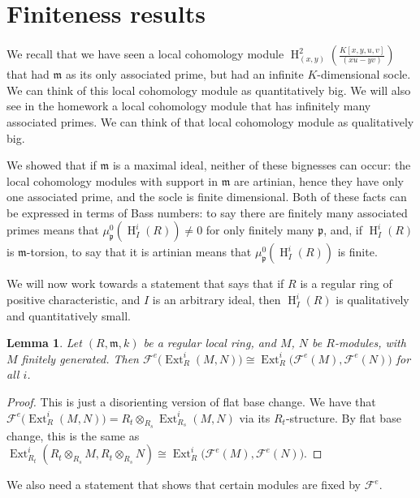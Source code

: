 \documentclass[11pt]{book}
\newtheorem{lemma}[theorem]{Lemma}
\numberwithin{equation}{section}
\numberwithin{theorem}{chapter}
\theoremstyle{definition}
\newtheorem*{basic properties}{Basic Properties}
\newtheorem*{Important Remark}{Important Remark}
\theoremstyle{remark}
\newcommand{\m}{\mathfrak{m}}
\newcommand{\p}{\mathfrak{p}}
\newcommand{\cF}{\mathcal{F}}
\newcommand{\Ext}{\operatorname{Ext}}
\renewcommand{\H}{\operatorname{H}}
\begin{document}
\section{Finiteness results}

We recall that we have seen a local cohomology module $\H^2_{(x,y)}(\frac{K[x,y,u,v]}{(xu-yv)})$ that had $\m$ as its only associated prime, but had an infinite $K$-dimensional socle. We can think of this local cohomology module as quantitatively big. We will also see in the homework a local cohomology module that has infinitely many associated primes. We can think of that local cohomology module as qualitatively big.

We showed that if $\m$ is a maximal ideal, neither of these bignesses can occur: the local cohomology modules with support in $\m$ are artinian, hence they have only one associated prime, and the socle is finite dimensional. Both of these facts can be expressed in terms of Bass numbers: to say there are finitely many associated primes means that $\mu^0_\p(\H^i_I(R))\neq 0$ for only finitely many $\p$, and, if $\H^i_I(R)$ is $\m$-torsion, to say that it is artinian means that $\mu^0_\p(\H^i_I(R))$ is finite.

We will now work towards a statement that says that if $R$ is a regular ring of positive characteristic, and $I$ is an arbitrary ideal, then $\H^i_I(R)$ is qualitatively and quantitatively small.


\begin{lemma}
	Let $(R,\m,k)$ be a regular local ring, and $M$, $N$ be $R$-modules, with $M$ finitely generated. Then $\cF^e\big(\Ext_R^i(M,N)\big)\cong \Ext_R^i\big(\cF^e(M),\cF^e(N)\big)$ for all $i$.
\end{lemma}
\begin{proof}
	This is just a disorienting version of flat base change. We have that
$\cF^e\big(\Ext_R^i(M,N)\big) = R_t \otimes_{R_s} \Ext_{R_s}^i(M,N)$ via its $R_t$-structure. By flat base change, this is the same as $\Ext_{R_t}^i(R_t \otimes_{R_s} M,R_t \otimes_{R_s} N)\cong \Ext_R^i\big(\cF^e(M),\cF^e(N)\big)$.
\end{proof}

We also need a statement that shows that certain modules are fixed by $\cF^e$.
\end{document}
